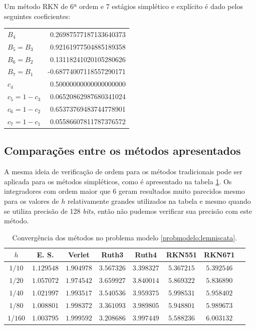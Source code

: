 \begin{method}[RKN671]\label{metodo:rkn671}
    Um método RKN de 6ª ordem e 7 estágios simplético e explícito é dado pelos seguintes coeficientes:
    \begin{table}[H]
        \centering
        \begin{tabular}{lr}
            \hline
            $B_4$           &  0.26987577187133640373 \\ 
            $B_5 = B_3$     &  0.92161977504885189358 \\ 
            $B_6 = B_2$     &  0.13118241020105280626 \\ 
            $B_7 = B_1$     & -0.68774007118557290171 \\ 
            $c_4$           &  0.50000000000000000000 \\ 
            $c_5 = 1 - c_3$ &  0.06520862987680341024 \\ 
            $c_6 = 1 - c_2$ &  0.65373769483744778901 \\ 
            $c_7 = 1 - c_1$ &  0.05586607811787376572 \\ 
            \hline
        \end{tabular}
    \end{table}
\end{method}

\subsection{Comparações entre os métodos apresentados}
A mesma ideia de verificação de ordem para os métodos tradicionais pode ser aplicada para os métodos simpléticos, como é apresentado na tabela \ref{tab:convergencia_metodos_simpleticos}. Os integradores com ordem maior que 6 geram resultados muito parecidos mesmo para os valores de $h$ relativamente grandes utilizados na tabela e mesmo quando se utiliza precisão de 128 \textit{bits}, então não pudemos verificar sua precisão com este método.

\begin{table}[]
    \centering
    \begin{tabular}{c|ccccccc}
        $h$     & E. S. & Verlet & Ruth3 & Ruth4 & RKN551 & RKN671  \\
        \hline
        $1/10$  & $1.129548$ & $1.904978$ & $3.567326$ & $3.398327$ & $5.367215$ & $5.392546$ \\
        $1/20$  & $1.057072$ & $1.974542$ & $3.659927$ & $3.840014$ & $5.869322$ & $5.836890$ \\
        $1/40$  & $1.021997$ & $1.993517$ & $3.540536$ & $3.959375$ & $5.998531$ & $5.958402$ \\
        $1/80$  & $1.008801$ & $1.998372$ & $3.361093$ & $3.989805$ & $5.948801$ & $5.989673$ \\
        $1/160$ & $1.003795$ & $1.999592$ & $3.208686$ & $3.997449$ & $5.588236$ & $6.003132$ \\
    \end{tabular}
    \caption{Convergência dos métodos no problema modelo \ref{probmodelo:lemniscata}.}
    \label{tab:convergencia_metodos_simpleticos}
\end{table}

